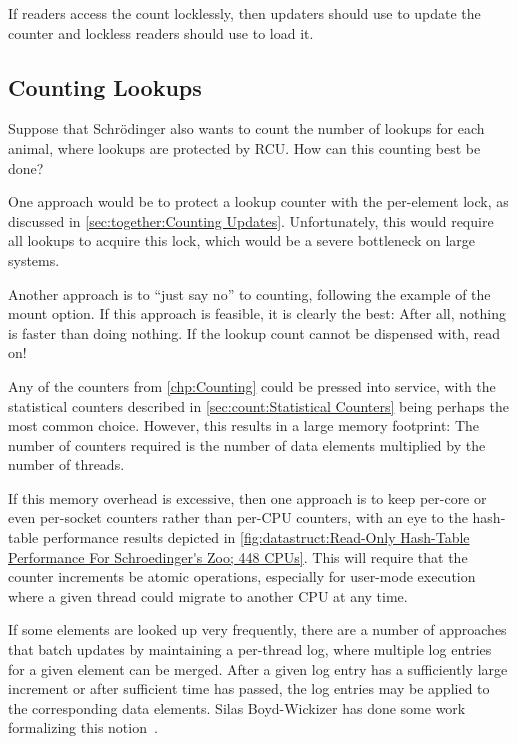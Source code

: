 If readers access the count locklessly, then updaters should use
 to update the counter and lockless readers should
use  to load it.

\fi

\subsection{Counting Lookups}
\label{sec:together:Counting Lookups}

Suppose that Schr\"odinger also wants to count the number of lookups for
each animal, where lookups are protected by RCU\@.
How can this counting best be done?

One approach would be to protect a lookup counter with the per-element
lock, as discussed in \cref{sec:together:Counting Updates}.
Unfortunately, this would require all lookups to acquire this lock,
which would be a severe bottleneck on large systems.

Another approach is to ``just say no'' to counting, following the example
of the  mount option.
If this approach is feasible, it is clearly the best:  After all, nothing
is faster than doing nothing.
If the lookup count cannot be dispensed with, read on!

Any of the counters from \cref{chp:Counting}
could be pressed into service, with the statistical counters described in
\cref{sec:count:Statistical Counters} being perhaps the most common choice.
However, this results in a large memory footprint: The number of counters
required is the number of data elements multiplied by the number of
threads.

If this memory overhead is excessive, then one approach is to keep
per-core or even per-socket counters rather than per-CPU counters,
with an eye to the hash-table performance results depicted in
\cref{fig:datastruct:Read-Only Hash-Table Performance For Schroedinger's Zoo; 448 CPUs}.
This will require that the counter increments be atomic operations,
especially for user-mode execution where a given thread could migrate
to another CPU at any time.

If some elements are looked up very frequently, there are a number
of approaches that batch updates by maintaining a per-thread log,
where multiple log entries for a given element can be merged.
After a given log entry has a sufficiently large increment or after
sufficient time has passed, the log entries may be applied to the
corresponding data elements.
Silas Boyd-Wickizer has done some work formalizing this
notion~\cite{SilasBoydWickizerPhD}.
